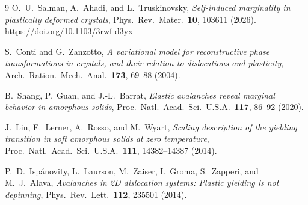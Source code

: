 \documentclass[11pt,a4paper]{article}
\begin{document}
\vspace{-6pt}
\begin{thebibliography}{9}
\small
\setlength{\itemsep}{1pt}
\setlength{\parsep}{0pt}
O.~U.\ Salman, A.~Ahadi, and L.~Truskinovsky,
\emph{Self-induced marginality in plastically deformed crystals},
Phys.\ Rev.\ Mater.\ \textbf{10}, 103611 (2026).
\url{https://doi.org/10.1103/3rwf-d3yx}

S.~Conti and G.~Zanzotto,
\emph{A variational model for reconstructive phase transformations in crystals, and their relation to dislocations and plasticity},
Arch.\ Ration.\ Mech.\ Anal.\ \textbf{173}, 69--88 (2004).

B.~Shang, P.~Guan, and J.-L.\ Barrat,
\emph{Elastic avalanches reveal marginal behavior in amorphous solids},
Proc.\ Natl.\ Acad.\ Sci.\ U.S.A.\ \textbf{117}, 86--92 (2020).

J.~Lin, E.~Lerner, A.~Rosso, and M.~Wyart,
\emph{Scaling description of the yielding transition in soft amorphous solids at zero temperature},
Proc.\ Natl.\ Acad.\ Sci.\ U.S.A.\ \textbf{111}, 14382--14387 (2014).

P.~D.\ Isp\'anovity, L.~Laurson, M.~Zaiser, I.~Groma, S.~Zapperi, and M.~J.\ Alava,
\emph{Avalanches in 2D dislocation systems: Plastic yielding is not depinning},
Phys.\ Rev.\ Lett.\ \textbf{112}, 235501 (2014).
\end{thebibliography}
\end{document}
